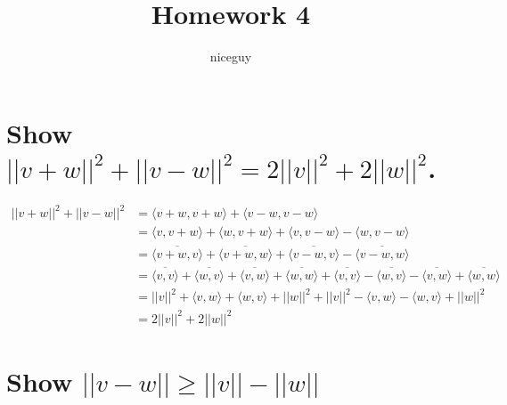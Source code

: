 \documentclass[answers]{exam}
\author{niceguy}
\title{Homework 4}
\begin{document}
\maketitle

\begin{questions}


\begin{parts}

\part{Show $||v+w||^2 + ||v-w||^2 = 2||v||^2 + 2||w||^2$.}

\begin{solution}
	\begin{align*}
		||v+w||^2 + ||v-w||^2 &= \langle v+w,v+w \rangle + \langle v-w,v-w \rangle \\
				      &= \langle v,v+w \rangle + \langle w,v+w \rangle + \langle v,v-w \rangle - \langle w,v-w \rangle \\
				      &= \overline{\langle v+w,v \rangle} + \overline{\langle v+w,w \rangle} + \overline{\langle v-w,v \rangle} - \overline{\langle v-w,w \rangle} \\
				      &= \overline{\langle v,v \rangle} + \overline{\langle w,v \rangle} + \overline{\langle v,w \rangle} + \overline{\langle w,w \rangle} + \overline{\langle v,v \rangle} - \overline{\langle w,v \rangle} - \overline{\langle v,w \rangle} + \overline{\langle w,w \rangle} \\
				      &= ||v||^2 + \langle v,w \rangle + \langle w,v \rangle + ||w||^2 + ||v||^2 - \langle v,w \rangle - \langle w,v \rangle + ||w||^2 \\
				      &= 2||v||^2 + 2||w||^2
	\end{align*}
\end{solution}

\part{Show $||v-w|| \geq ||v|| - ||w||$}


\end{parts}
\end{questions}
\end{document}
